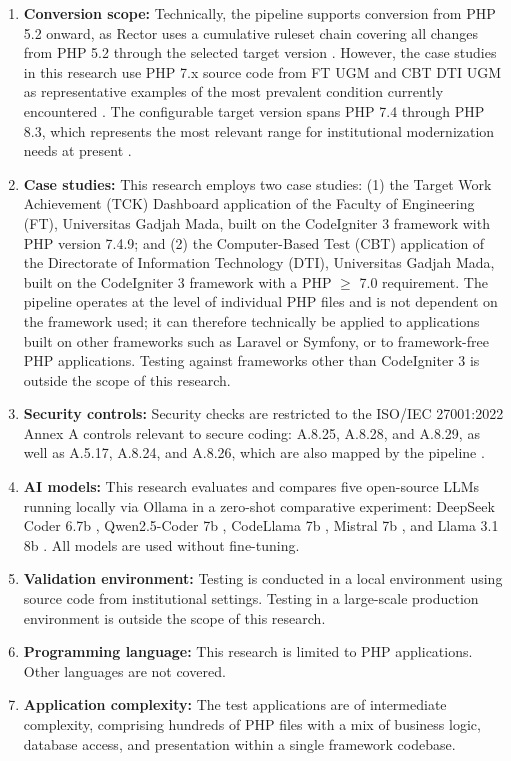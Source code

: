 \begin{enumerate}
    \item \textbf{Conversion scope:} Technically, the pipeline supports conversion from PHP 5.2 onward, as Rector uses a cumulative ruleset chain covering all changes from PHP 5.2 through the selected target version \cite{rector2024}. However, the case studies in this research use PHP 7.x source code from FT UGM and CBT DTI UGM as representative examples of the most prevalent condition currently encountered \cite{w3techs2024php}. The configurable target version spans PHP 7.4 through PHP 8.3, which represents the most relevant range for institutional modernization needs at present \cite{phpgroup2022supported}.
    \item \textbf{Case studies:} This research employs two case studies: (1) the Target Work Achievement (TCK) Dashboard application of the Faculty of Engineering (FT), Universitas Gadjah Mada, built on the CodeIgniter 3 framework with PHP version 7.4.9; and (2) the Computer-Based Test (CBT) application of the Directorate of Information Technology (DTI), Universitas Gadjah Mada, built on the CodeIgniter 3 framework with a PHP $\geq$ 7.0 requirement. The pipeline operates at the level of individual PHP files and is not dependent on the framework used; it can therefore technically be applied to applications built on other frameworks such as Laravel or Symfony, or to framework-free PHP applications. Testing against frameworks other than CodeIgniter 3 is outside the scope of this research.
    \item \textbf{Security controls:} Security checks are restricted to the ISO/IEC 27001:2022 Annex A controls relevant to secure coding: A.8.25, A.8.28, and A.8.29, as well as A.5.17, A.8.24, and A.8.26, which are also mapped by the pipeline \cite{iso27001_2022}.
    \item \textbf{AI models:} This research evaluates and compares five open-source LLMs running locally via Ollama \cite{ollama2024} in a zero-shot comparative experiment: DeepSeek Coder 6.7b \cite{deepseek2024coder}, Qwen2.5-Coder 7b \cite{hui2024qwen}, CodeLlama 7b \cite{roziere2024codellama}, Mistral 7b \cite{jiang2023mistral}, and Llama 3.1 8b \cite{dubey2024llama3}. All models are used without fine-tuning.
    \item \textbf{Validation environment:} Testing is conducted in a local environment using source code from institutional settings. Testing in a large-scale production environment is outside the scope of this research.
    \item \textbf{Programming language:} This research is limited to PHP applications. Other languages are not covered.
    \item \textbf{Application complexity:} The test applications are of intermediate complexity, comprising hundreds of PHP files with a mix of business logic, database access, and presentation within a single framework codebase.
\end{enumerate}

